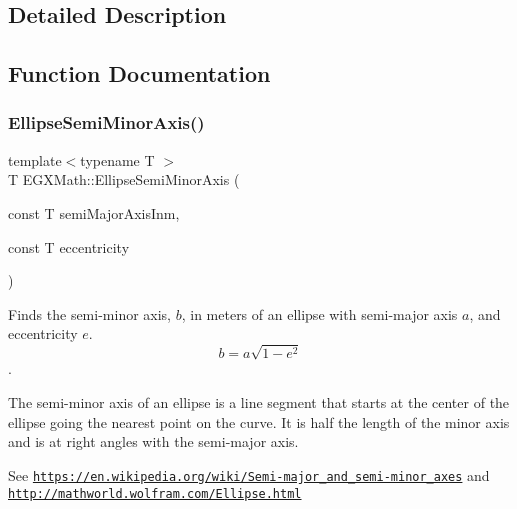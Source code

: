 \subsection{Detailed Description}


\subsection{Function Documentation}
\mbox{\label{group___e_g_x_math-_geometry-2_d-_ellipse-_semi_minor_axis_gae461acf3333565d69527dd86e9aa2b32}} 
\subsubsection{\texorpdfstring{Ellipse\+Semi\+Minor\+Axis()}{EllipseSemiMinorAxis()}}
{\footnotesize\ttfamily template$<$typename T $>$ \\
T E\+G\+X\+Math\+::\+Ellipse\+Semi\+Minor\+Axis (\begin{DoxyParamCaption}\item[{const T}]{semi\+Major\+Axis\+Inm,  }\item[{const T}]{eccentricity }\end{DoxyParamCaption})}



Finds the semi-\/minor axis, $b$, in meters of an ellipse with semi-\/major axis $a$, and eccentricity $e$. \[ b=a \sqrt{1-e^2} \]. 

The semi-\/minor axis of an ellipse is a line segment that starts at the center of the ellipse going the nearest point on the curve. It is half the length of the minor axis and is at right angles with the semi-\/major axis.

See \href{https://en.wikipedia.org/wiki/Semi-major_and_semi-minor_axes}{\tt https\+://en.\+wikipedia.\+org/wiki/\+Semi-\/major\+\_\+and\+\_\+semi-\/minor\+\_\+axes} and \href{http://mathworld.wolfram.com/Ellipse.html}{\tt http\+://mathworld.\+wolfram.\+com/\+Ellipse.\+html}


